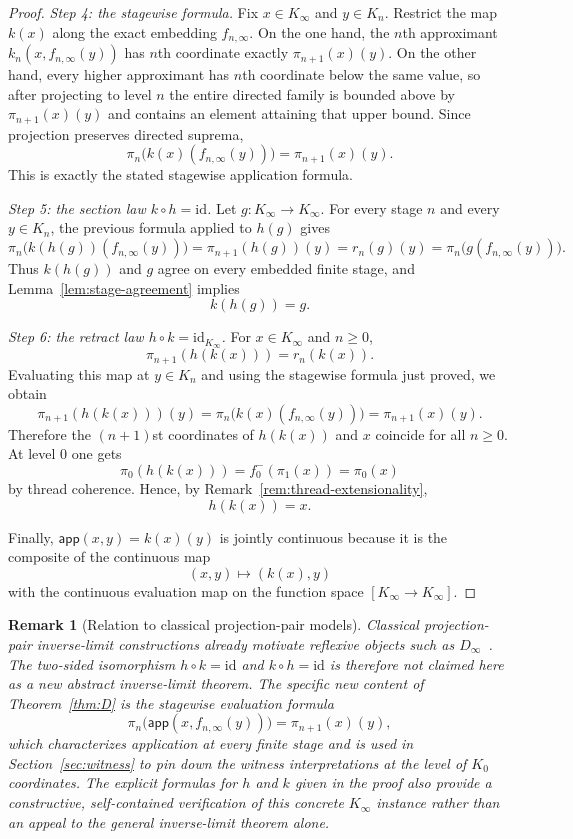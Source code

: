 \documentclass[webpdf,traditional,large,numbered]{oup-authoring-template}
\theoremstyle{thmstyleone}%
\theoremstyle{thmstyletwo}%
\newtheorem{remark}[theorem]{Remark}
\theoremstyle{thmstylethree}%
\newcommand{\Kinf}{K_\infty}
\begin{document}
\begin{proof}
  \smallskip
  \noindent\emph{Step 4: the stagewise formula.}
  Fix $x\in\Kinf$ and $y\in K_n$. Restrict the map $k(x)$ along the exact
  embedding $f_{n,\infty}$. On the one hand, the $n$th approximant
  $k_n(x,f_{n,\infty}(y))$ has $n$th coordinate exactly
  $\pi_{n+1}(x)(y)$. On the other hand, every higher approximant has $n$th
  coordinate below the same value, so after projecting to level $n$ the entire
  directed family is bounded above by $\pi_{n+1}(x)(y)$ and contains an element
  attaining that upper bound. Since projection preserves directed suprema,
  \[
    \pi_n\bigl(k(x)(f_{n,\infty}(y))\bigr)=\pi_{n+1}(x)(y).
  \]
  This is exactly the stated stagewise application formula.

  \smallskip
  \noindent\emph{Step 5: the section law $k\circ h=\mathrm{id}$.}
  Let $g:\Kinf\to\Kinf$. For every stage $n$ and every $y\in K_n$, the previous
  formula applied to $h(g)$ gives
  \[
    \pi_n\bigl(k(h(g))(f_{n,\infty}(y))\bigr)
      = \pi_{n+1}(h(g))(y)
      = r_n(g)(y)
      = \pi_n\bigl(g(f_{n,\infty}(y))\bigr).
  \]
  Thus $k(h(g))$ and $g$ agree on every embedded finite stage, and
  Lemma~\ref{lem:stage-agreement} implies
  \[
    k(h(g))=g.
  \]

  \smallskip
  \noindent\emph{Step 6: the retract law $h\circ k=\mathrm{id}_{\Kinf}$.}
  For $x\in\Kinf$ and $n\ge 0$,
  \[
    \pi_{n+1}(h(k(x)))=r_n(k(x)).
  \]
  Evaluating this map at $y\in K_n$ and using the stagewise formula just proved,
  we obtain
  \[
    \pi_{n+1}(h(k(x)))(y)
      = \pi_n\bigl(k(x)(f_{n,\infty}(y))\bigr)
      = \pi_{n+1}(x)(y).
  \]
  Therefore the $(n+1)$st coordinates of $h(k(x))$ and $x$ coincide for all
  $n\ge 0$. At level $0$ one gets
  \[
    \pi_0(h(k(x)))=f_0^-(\pi_1(x))=\pi_0(x)
  \]
  by thread coherence. Hence, by Remark~\ref{rem:thread-extensionality},
  \[
    h(k(x))=x.
  \]

  Finally, $\mathsf{app}(x,y)=k(x)(y)$ is jointly continuous because it is the
  composite of the continuous map
  \[
    (x,y)\longmapsto (k(x),y)
  \]
  with the continuous evaluation map on the function space
  $[\Kinf\to\Kinf]$.
\end{proof}

\begin{remark}[Relation to classical projection-pair models]
Classical projection-pair inverse-limit constructions already motivate
reflexive objects such as $D_\infty$~\cite{Scott:continuous,AbramskyJung:domain}.
The two-sided isomorphism $h\circ k=\mathrm{id}$ and
$k\circ h=\mathrm{id}$ is therefore not claimed here as a new abstract
inverse-limit theorem.  The specific new content of Theorem~\ref{thm:D} is the
stagewise evaluation formula
\[
\pi_n\bigl(\mathsf{app}(x,f_{n,\infty}(y))\bigr)=\pi_{n+1}(x)(y),
\]
which characterizes application at every finite stage and is used in
Section~\ref{sec:witness} to pin down the witness interpretations at the level
of $K_0$ coordinates.  The explicit formulas for $h$ and $k$ given in the
proof also provide a constructive, self-contained verification of this concrete
$\Kinf$ instance rather than an appeal to the general inverse-limit theorem
alone.
\end{remark}
\end{document}
